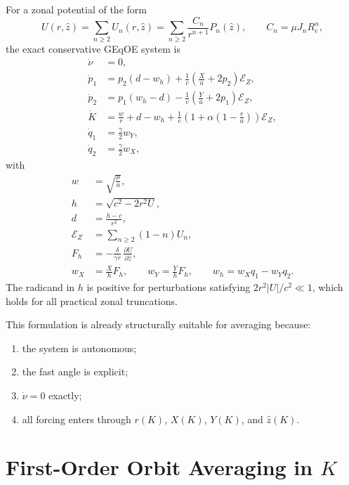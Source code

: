 \documentclass[11pt]{article}
\begin{document}
For a zonal potential of the form
\begin{equation}
U(r,\hat z) = \sum_{n\ge 2} U_n(r,\hat z)
= \sum_{n\ge 2} \frac{C_n}{r^{n+1}} P_n(\hat z),
\qquad
C_n = \mu J_n R_e^n,
\end{equation}
the exact conservative GEqOE system is
\begin{align}
\dot{\nu} &= 0, \\
\dot{p}_1 &= p_2(d-w_h)
+ \frac{1}{c}\left(\frac{X}{a}+2p_2\right)\mathcal{E}_Z, \label{eq:p1_zonal}\\
\dot{p}_2 &= p_1(w_h-d)
- \frac{1}{c}\left(\frac{Y}{a}+2p_1\right)\mathcal{E}_Z, \label{eq:p2_zonal}\\
\dot{K} &= \frac{w}{r} + d - w_h
+ \frac{1}{c}\left(1+\alpha\left(1-\frac{r}{a}\right)\right)\mathcal{E}_Z, \\
\dot{q}_1 &= \frac{\gamma}{2} w_Y, \label{eq:q1_zonal}\\
\dot{q}_2 &= \frac{\gamma}{2} w_X, \label{eq:q2_zonal}
\end{align}
with
\begin{align}
w &= \sqrt{\frac{\mu}{a}}, \\
h &= \sqrt{c^2 - 2r^2 U}, \\
d &= \frac{h-c}{r^2}, \\
\mathcal{E}_Z &= \sum_{n\ge 2} (1-n) U_n, \label{eq:euler_combo}\\
F_h &= - \frac{\delta}{\gamma r}\,\frac{\partial U}{\partial \hat z}, \\
w_X &= \frac{X}{h}F_h, \qquad
w_Y = \frac{Y}{h}F_h, \qquad
w_h = w_X q_1 - w_Y q_2.
\end{align}
The radicand in $h$ is positive for perturbations satisfying
$2r^2|U|/c^2 \ll 1$, which holds for all practical zonal truncations.

This formulation is already structurally suitable for averaging because:
\begin{enumerate}
    \item the system is autonomous;
    \item the fast angle is explicit;
    \item $\dot{\nu}=0$ exactly;
    \item all forcing enters through $r(K)$, $X(K)$, $Y(K)$, and $\hat z(K)$.
\end{enumerate}

\section{First-Order Orbit Averaging in \texorpdfstring{$K$}{K}}
\label{sec:avg}
\end{document}

